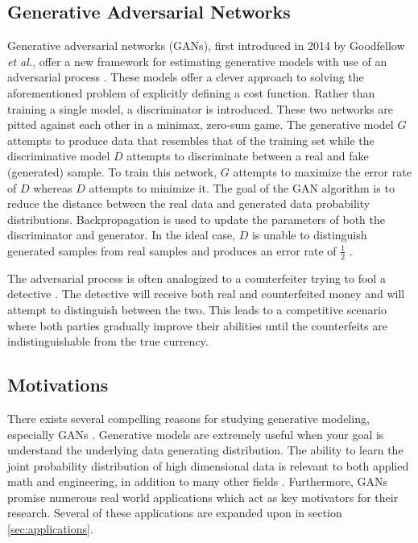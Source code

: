 \documentclass[11pt]{article}
\begin{document}
\subsection{Generative Adversarial Networks}
Generative adversarial networks (GANs), first introduced in 2014 by Goodfellow \textit{et al.}, offer a new framework for estimating generative models with use of an adversarial process \citep{2014arXiv1406.2661G}. These models offer a clever approach to solving the aforementioned problem of explicitly defining a cost function. Rather than training a single model, a discriminator is introduced. These two networks are pitted against each other in a minimax, zero-sum game. The generative model $G$ attempts to produce data that resembles that of the training set while the discriminative model $D$ attempts to discriminate between a real and fake (generated) sample. To train this network, $G$ attempts to maximize the error rate of $D$ whereas $D$ attempts to minimize it. The goal of the GAN algorithm is to reduce the distance between the real data and generated data probability distributions. Backpropagation is used to update the parameters of both the discriminator and generator. In the ideal case, $D$ is unable to distinguish generated samples from real samples and produces an error rate of $\frac{1}{2}$ \citep{2014arXiv1406.2661G}.

The adversarial process is often analogized to a counterfeiter trying to fool a detective \citep{2014arXiv1406.2661G}. The detective will receive both real and counterfeited money and will attempt to distinguish between the two. This leads to a competitive scenario where both parties gradually improve their abilities until the counterfeits are indistinguishable from the true currency.

\subsection{Motivations}
There exists several compelling reasons for studying generative modeling, especially GANs \citep{2017arXiv170100160G}. Generative models are extremely useful when your goal is understand the underlying data generating distribution. The ability to learn the joint probability distribution of high dimensional data is relevant to both applied math and engineering, in addition to many other fields \citep{2017arXiv170100160G}. Furthermore, GANs promise numerous real world applications which act as key motivators for their research. Several of these applications are expanded upon in section \ref{sec:applications}.
\end{document}
